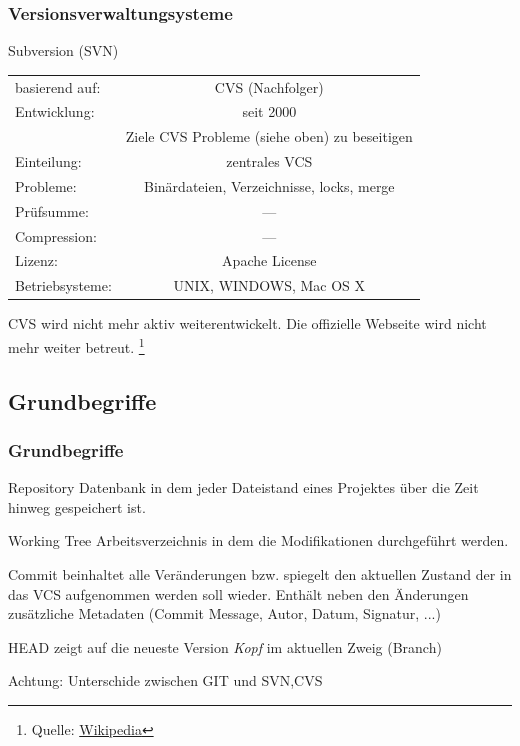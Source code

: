\documentclass{beamer}
\begin{document}
\begin{frame}\frametitle{Versionsverwaltungsysteme} 

\begin{block}{Subversion (SVN)}
	\begin{tabular}{l c}
basierend auf: & CVS (Nachfolger) \\ 
Entwicklung: & seit 2000  \\  
 & Ziele CVS Probleme (siehe oben) zu beseitigen \\
Einteilung: & zentrales VCS \\ 
Probleme: & Binärdateien, Verzeichnisse, locks, merge \\
Prüfsumme: & --- \\
Compression: & --- \\
Lizenz: & Apache License \\
Betriebsysteme: & UNIX, WINDOWS, Mac OS X \\
\end{tabular} 

\vspace*{0.3cm}
CVS wird nicht mehr aktiv weiterentwickelt. Die offizielle Webseite wird nicht mehr weiter betreut. \footnote{Quelle: \href{http://de.wikipedia.org/wiki/Concurrent_Versions_System}{Wikipedia}}
\end{block}


\end{frame}

\subsection{Grundbegriffe}
\begin{frame}\frametitle{Grundbegriffe}
\begin{block}{Repository}
Datenbank in dem jeder Dateistand eines Projektes über die Zeit hinweg gespeichert ist.
\end{block}

\begin{block}{Working Tree}
Arbeitsverzeichnis in dem die Modifikationen durchgeführt werden.
\end{block}

\begin{block}{Commit}
beinhaltet alle Veränderungen bzw. spiegelt den aktuellen Zustand der in das VCS aufgenommen werden soll wieder. Enthält neben den Änderungen zusätzliche Metadaten (Commit Message, Autor, Datum, Signatur, ...)
\end{block}

\begin{block}{HEAD}
zeigt auf die neueste Version \textit{Kopf} im aktuellen Zweig (Branch)

Achtung: Unterschide zwischen GIT und SVN,CVS
\end{block}
\end{frame}
\end{document}
